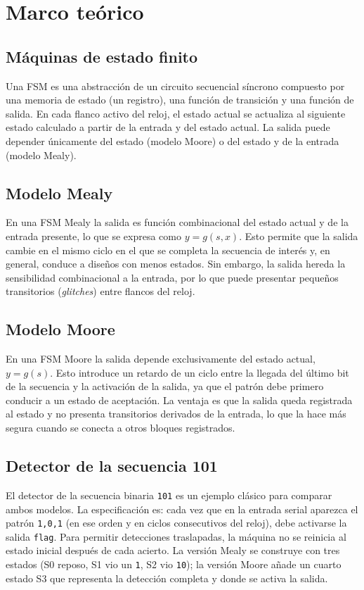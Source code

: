 \documentclass[12pt,letterpaper]{article}
\begin{document}
\section{Marco teórico}

\subsection{Máquinas de estado finito}
Una FSM es una abstracción de un circuito secuencial síncrono compuesto por una memoria de estado (un registro), una función de transición y una función de salida. En cada flanco activo del reloj, el estado actual se actualiza al siguiente estado calculado a partir de la entrada y del estado actual. La salida puede depender únicamente del estado (modelo Moore) o del estado y de la entrada (modelo Mealy).

\subsection{Modelo Mealy}
En una FSM Mealy la salida es función combinacional del estado actual y de la entrada presente, lo que se expresa como $y = g(s, x)$. Esto permite que la salida cambie en el mismo ciclo en el que se completa la secuencia de interés y, en general, conduce a diseños con menos estados. Sin embargo, la salida hereda la sensibilidad combinacional a la entrada, por lo que puede presentar pequeños transitorios (\textit{glitches}) entre flancos del reloj.

\subsection{Modelo Moore}
En una FSM Moore la salida depende exclusivamente del estado actual, $y = g(s)$. Esto introduce un retardo de un ciclo entre la llegada del último bit de la secuencia y la activación de la salida, ya que el patrón debe primero conducir a un estado de aceptación. La ventaja es que la salida queda registrada al estado y no presenta transitorios derivados de la entrada, lo que la hace más segura cuando se conecta a otros bloques registrados.

\subsection{Detector de la secuencia 101}
El detector de la secuencia binaria \texttt{101} es un ejemplo clásico para comparar ambos modelos. La especificación es: cada vez que en la entrada serial aparezca el patrón \texttt{1,0,1} (en ese orden y en ciclos consecutivos del reloj), debe activarse la salida \texttt{flag}. Para permitir detecciones traslapadas, la máquina no se reinicia al estado inicial después de cada acierto. La versión Mealy se construye con tres estados (S0 reposo, S1 vio un \texttt{1}, S2 vio \texttt{10}); la versión Moore añade un cuarto estado S3 que representa la detección completa y donde se activa la salida.
\end{document}
